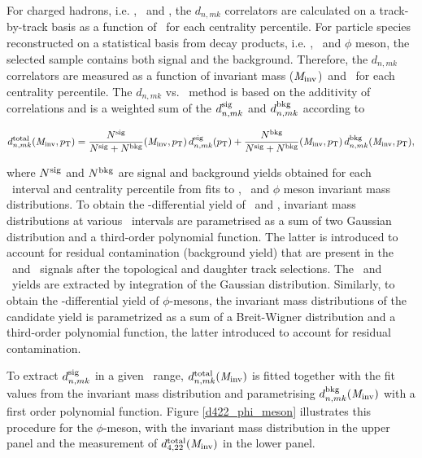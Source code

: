 For charged hadrons, i.e. \pion, \kaon~and \proton, the $d_{n,mk}$ correlators are calculated on a track-by-track basis as a function of \pT~for each centrality percentile. For particle species reconstructed on a statistical basis from decay products, i.e. \Ks, \lambdas~and $\phi$ meson, the selected sample contains both signal and the background. Therefore, the $d_{n,mk}$ correlators are measured as a function of invariant mass (${\it M}_{\rm inv}$)~and \pT~for each centrality percentile. The $d_{n,mk}$ vs. \minv~method is based on the additivity of correlations and is a weighted sum of the $d_{n,mk}^{\rm{sig}}$ and $d_{n,mk}^{\rm{bkg}}$ according to

\begin{equation}
d_{n,mk}^{\rm total}({\it M}_{\rm inv}, p_{\rm T}) = \frac{N^{\rm sig}}{N^{\rm sig}+N^{\rm bkg}}({\it M}_{\rm inv}, p_{\rm T})\,d_{n,mk}^{\rm sig}(p_{\rm T})+\frac{N^{\rm bkg}}{N^{{\rm sig}}+N^{{\rm bkg}}}({\it M}_{\rm inv}, p_{\rm T})\,d_{n,mk}^{\rm bkg}({\it M}_{\rm inv}, p_{\rm T}),
\label{Eq:dnmk}
\end{equation}

where $N^{\rm{sig}}$ and $N^{\rm{bkg}}$ are signal and background yields obtained for each \pT~interval and centrality percentile from fits to \Ks, \lambdas~and $\phi$ meson invariant mass distributions. To obtain the \pT-differential yield of \Ks~and \lambdas, invariant mass distributions at various \pT~intervals are parametrised as a sum of two Gaussian distribution and a third-order polynomial function. The latter is introduced to account for residual contamination (background yield) that are present in the \Ks~and \lambdas~signals after the topological and daughter track selections. The \Ks~and \lambdas~yields are extracted by integration of the Gaussian distribution. %
Similarly, to obtain the \pT-differential yield of $\phi$-mesons, the invariant mass distributions of the candidate yield is parametrized as a sum of a Breit-Wigner distribution and a third-order polynomial function, the latter introduced to account for residual contamination.

To extract $d_{n,mk}^{\rm{sig}}$ in a given \pT~range, $d_{n,mk}^{\rm total}({\it M}_{\rm inv})$ is fitted together with the fit values from the invariant mass distribution and parametrising $d_{n,mk}^{\rm{bkg}}({\it M}_{\rm inv})$ with a first order polynomial function. Figure \ref{d422_phi_meson} illustrates this procedure for the $\phi$-meson, with the invariant mass distribution in the upper panel and the measurement of $d_{4,22}^{\rm total}({\it M}_{\rm inv})$ in the lower panel. 

